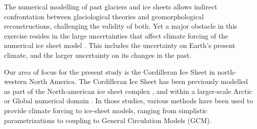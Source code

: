 
\introduction
\label{sec:intro}

The numerical modelling of past glaciers and ice sheets allows indirect confrontation between glaciological theories and geomorphological reconstructions, challenging the validity of both. Yet a major obstacle in this exercise resides in the large uncertainties that affect climate forcing of the numerical ice sheet model \citep{hebeler-etal-2008}. This includes the uncertainty on Earth's present climate, and the larger uncertainty on its changes in the past.

Our area of focus for the present study is the Cordilleran Ice Sheet in north-western North America.
The Cordilleran Ice Sheet has been previously modelled as part of the North-american ice sheet complex \citep{marshall-clarke-1999,calov-etal-2002,tarasov-peltier-2004,bintanja-etal-2005,gregoire-etal-2012}, and within a larger-scale Arctic or Global numerical domain \citep{huybrechts-tsiobbel-1996,charbit-etal-2002,johnson-fastook-2002,zweck-huybrechts-2005,abeouchi-etal-2007,charbit-etal-2013}. In those studies, various methods have been used to provide climate forcing to ice-sheet models, ranging from simplistic parametrizations to coupling to General Circulation Models (GCM).

